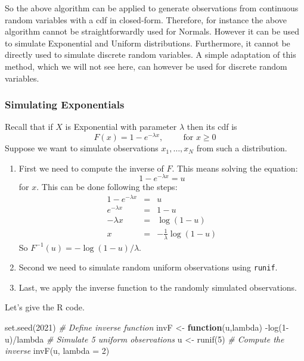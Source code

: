\documentclass[
]{book}
\newenvironment{Shaded}{\begin{snugshade}}{\end{snugshade}}
\newcommand{\AttributeTok}[1]{\textcolor[rgb]{0.77,0.63,0.00}{#1}}
\newcommand{\CommentTok}[1]{\textcolor[rgb]{0.56,0.35,0.01}{\textit{#1}}}
\newcommand{\ControlFlowTok}[1]{\textcolor[rgb]{0.13,0.29,0.53}{\textbf{#1}}}
\newcommand{\DecValTok}[1]{\textcolor[rgb]{0.00,0.00,0.81}{#1}}
\newcommand{\FunctionTok}[1]{\textcolor[rgb]{0.00,0.00,0.00}{#1}}
\newcommand{\NormalTok}[1]{#1}
\newcommand{\OtherTok}[1]{\textcolor[rgb]{0.56,0.35,0.01}{#1}}
\newcommand{\SpecialCharTok}[1]{\textcolor[rgb]{0.00,0.00,0.00}{#1}}
\begin{document}
So the above algorithm can be applied to generate observations from continuous random variables with a cdf in closed-form. Therefore, for instance the above algorithm cannot be straightforwardly used for Normals. However it can be used to simulate Exponential and Uniform distributions. Furthermore, it cannot be directly used to simulate discrete random variables. A simple adaptation of this method, which we will not see here, can however be used for discrete random variables.

\hypertarget{simulating-exponentials}{%
\subsubsection{Simulating Exponentials}\label{simulating-exponentials}}

Recall that if \(X\) is Exponential with parameter \(\lambda\) then its cdf is
\[
F(x)= 1- e^{-\lambda x}, \hspace{1cm} \mbox{for } x\geq 0
\]
Suppose we want to simulate observations \(x_1,\dots,x_N\) from such a distribution.

\begin{enumerate}
\def\labelenumi{\arabic{enumi}.}
\item
  First we need to compute the inverse of \(F\). This means solving the equation:
  \[
  1-e^{-\lambda x} = u
  \]
  for \(x\). This can be done following the steps:
  \begin{eqnarray*}
  1-e^{-\lambda x} &=& u\\
  e^{-\lambda x} &=& 1 - u\\
  -\lambda x &=& \log(1-u)\\
  x &=& -\frac{1}{\lambda}\log(1-u)
  \end{eqnarray*}
  So \(F^{-1}(u)=-\log(1-u)/\lambda\).
\item
  Second we need to simulate random uniform observations using \texttt{runif}.
\item
  Last, we apply the inverse function to the randomly simulated observations.
\end{enumerate}

Let's give the R code.

\begin{Shaded}
\begin{Highlighting}[]
\FunctionTok{set.seed}\NormalTok{(}\DecValTok{2021}\NormalTok{)}
\CommentTok{\# Define inverse function}
\NormalTok{invF }\OtherTok{\textless{}{-}} \ControlFlowTok{function}\NormalTok{(u,lambda) }\SpecialCharTok{{-}}\FunctionTok{log}\NormalTok{(}\DecValTok{1}\SpecialCharTok{{-}}\NormalTok{u)}\SpecialCharTok{/}\NormalTok{lambda}
\CommentTok{\# Simulate 5 uniform observations}
\NormalTok{u }\OtherTok{\textless{}{-}} \FunctionTok{runif}\NormalTok{(}\DecValTok{5}\NormalTok{)}
\CommentTok{\# Compute the inverse }
\FunctionTok{invF}\NormalTok{(u, }\AttributeTok{lambda =} \DecValTok{2}\NormalTok{)}
\end{Highlighting}
\end{Shaded}
\end{document}
